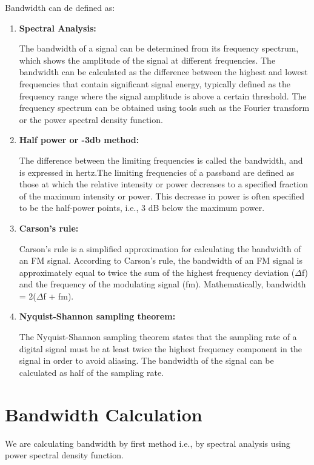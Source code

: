 \documentclass[journal,12pt,twocolumn]{article}
\begin{document}
Bandwidth can de defined as:
\begin{enumerate}

\item{\textbf{Spectral Analysis:}

	The bandwidth of a signal can be determined from its frequency spectrum, which shows the amplitude of the signal at different frequencies. The bandwidth can be calculated as the difference between the highest and lowest frequencies that contain significant signal energy, typically defined as the frequency range where the signal amplitude is above a certain threshold. The frequency spectrum can be obtained using tools such as the Fourier transform or the power spectral density function.}

\item{\textbf{Half power or -3db method:}

	The difference between the limiting frequencies is called the bandwidth, and is expressed in hertz.The limiting frequencies of a passband are defined as those at which the relative intensity or power decreases to a specified fraction of the maximum intensity or power. This decrease in power is often specified to be the half-power points, i.e., 3 dB below the maximum power.}

\item{\textbf{Carson's rule:}

	Carson's rule is a simplified approximation for calculating the bandwidth of an FM signal. According to Carson's rule, the bandwidth of an FM signal is approximately equal to twice the sum of the highest frequency deviation (${\Delta}$f) and the frequency of the modulating signal (fm). Mathematically, bandwidth = 2(${\Delta}$f + fm).}

\item{\textbf{Nyquist-Shannon sampling theorem:}

	The Nyquist-Shannon sampling theorem states that the sampling rate of a digital signal must be at least twice the highest frequency component in the signal in order to avoid aliasing. The bandwidth of the signal can be calculated as half of the sampling rate.}

\end{enumerate}


\section{Bandwidth Calculation}
	We are calculating bandwidth by first method i.e., by spectral analysis using power spectral density function.
	
\end{document}
